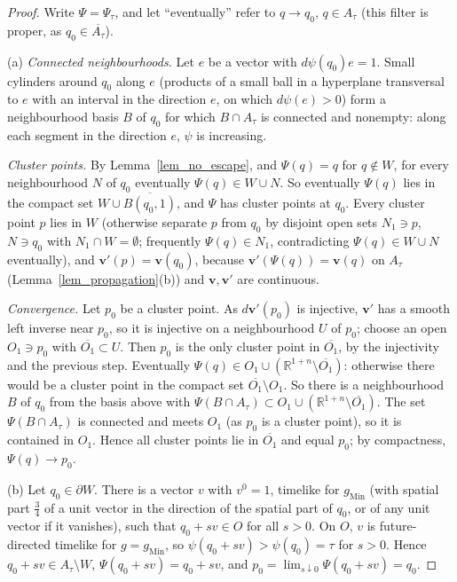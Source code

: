 \documentclass[11pt,a4paper,reqno]{amsart}
\theoremstyle{definition}
\numberwithin{equation}{section}
\newcommand{\R}{\mathbb{R}}
\newcommand{\gM}{g_{\mathrm{Min}}}
\begin{document}
\begin{proof}
Write $\Psi=\Psi_\tau$, and let ``eventually'' refer to $q\to q_0$, $q\in A_\tau$ (this filter is proper, as
$q_0\in\overline{A_\tau}$).

(a) \emph{Connected neighbourhoods.} Let $e$ be a vector with $d\psi(q_0)e=1$. Small cylinders around $q_0$ along $e$
(products of a small ball in a hyperplane transversal to $e$ with an interval in the direction $e$, on which
$d\psi(e)>0$) form a neighbourhood basis $B$ of $q_0$ for which $B\cap A_\tau$ is connected and nonempty: along each
segment in the direction $e$, $\psi$ is increasing.

\emph{Cluster points.} By Lemma~\ref{lem_no_escape}, and $\Psi(q)=q$ for $q\notin W$, for every neighbourhood $N$ of $q_0$
eventually $\Psi(q)\in W\cup N$. So eventually $\Psi(q)$ lies in the compact set $W\cup\overline{B(q_0,1)}$, and $\Psi$
has cluster points at $q_0$. Every cluster point $p$ lies in $W$ (otherwise separate $p$ from $q_0$ by disjoint open sets
$N_1\ni p$, $N\ni q_0$ with $N_1\cap W=\emptyset$; frequently $\Psi(q)\in N_1$, contradicting $\Psi(q)\in W\cup N$
eventually), and $\mathbf v'(p)=\mathbf v(q_0)$, because $\mathbf v'(\Psi(q))=\mathbf v(q)$ on $A_\tau$
(Lemma~\ref{lem_propagation}(b)) and $\mathbf v,\mathbf v'$ are continuous.

\emph{Convergence.} Let $p_0$ be a cluster point. As $d\mathbf v'(p_0)$ is injective, $\mathbf v'$ has a smooth left inverse
near $p_0$, so it is injective on a neighbourhood $U$ of $p_0$; choose an open $O_1\ni p_0$ with
$\overline{O_1}\subset U$. Then $p_0$ is the only cluster point in $\overline{O_1}$, by the injectivity and the previous
step. Eventually $\Psi(q)\in O_1\cup(\R^{1+n}\setminus\overline{O_1})$: otherwise there would be a cluster point in the
compact set $\overline{O_1}\setminus O_1$. So there is a neighbourhood $B$ of $q_0$ from the basis above with
$\Psi(B\cap A_\tau)\subset O_1\cup(\R^{1+n}\setminus\overline{O_1})$. The set $\Psi(B\cap A_\tau)$ is connected and meets
$O_1$ (as $p_0$ is a cluster point), so it is contained in $O_1$. Hence all cluster points lie in $\overline{O_1}$ and equal
$p_0$; by compactness, $\Psi(q)\to p_0$.

(b) Let $q_0\in\partial W$. There is a vector $v$ with $v^0=1$, timelike for $\gM$ (with spatial part $\frac34$ of a unit
vector in the direction of the spatial part of $q_0$, or of any unit vector if it vanishes), such that $q_0+sv\in O$ for all
$s>0$. On $O$, $v$ is future-directed timelike for $g=\gM$, so $\psi(q_0+sv)>\psi(q_0)=\tau$ for $s>0$. Hence
$q_0+sv\in A_\tau\setminus W$, $\Psi(q_0+sv)=q_0+sv$, and $p_0=\lim_{s\downarrow0}\Psi(q_0+sv)=q_0$.


\end{proof}
\end{document}

